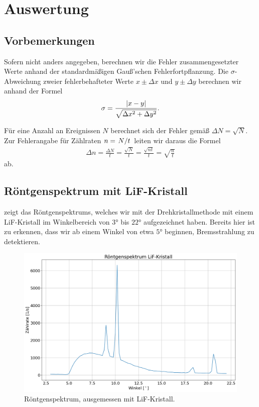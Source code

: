 \section{Auswertung}

\subsection*{Vorbemerkungen}

Sofern nicht anders angegeben, berechnen wir die Fehler zusammengesetzter Werte anhand der standardmäßigen Gauß'schen Fehlerfortpflanzung. Die $\sigma$-Abweichung zweier fehlerbehafteter Werte $x \pm \Delta x$ und $y \pm \Delta y$ berechnen wir anhand der Formel
\begin{align}
  \sigma = \frac{\qty|x - y|}{\sqrt{\Delta x^2 + \Delta y^2}}.
\end{align}

Für eine Anzahl an Ereignissen $N$ berechnet sich der Fehler gemäß $\Delta N = \sqrt{N}$. Zur Fehlerangabe für Zählraten $n = \flatfrac{N}{t}$ leiten wir daraus die Formel
\begin{align}
  \Delta n = \frac{\Delta N}{t}= \frac{\sqrt{N}}{t} = \frac{\sqrt{nt}}{t} = \sqrt{\frac{n}{t}}
\end{align}
ab.

\subsection{Röntgenspektrum mit LiF-Kristall}

 zeigt das Röntgenspektrums, welches wir mit der Drehkristallmethode mit einem LiF-Kristall im Winkelbereich von $3\si{\degree}$ bis $22\si{\degree}$ aufgezeichnet haben. Bereits hier ist zu erkennen, dass wir ab einem Winkel von etwa $5\si{\degree}$ beginnen, Bremsstrahlung zu detektieren.

\begin{figure}[H]
  \centering
  \includegraphics[width=.9\textwidth]{files/plots/spektrum_lif_komplett.png}
  \caption{Röntgenspektrum, ausgemessen mit LiF-Kristall.}
  \label{fig:spektrum_lif_komplett}
\end{figure}

